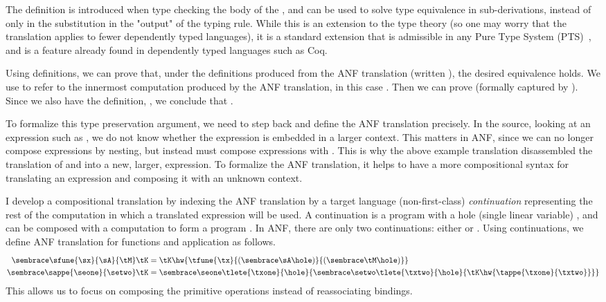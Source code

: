 The definition \im{\tx = \te} is introduced when type checking the body of the
, and can be used to solve type equivalence in sub-derivations,
instead of only in the substitution \im{\subst{\tApr}{\te}{\tx}} in the "output"
of the typing rule.
While this is an extension to the type theory (so one may worry that the
 translation applies to fewer dependently typed languages), it is a
standard extension that is admissible in any Pure Type System
(PTS)~\cite{severi1994:dpts}, and is a feature already found in dependently
typed languages such as Coq.

Using definitions, we can prove that, under the definitions  produced from the ANF translation
\im{\sembrace{\setwo}} (written \im{\edefs{\setwo}}), the desired equivalence
\im{\txtwo \equiv \sembrace{\setwo}} holds.
We use \im{\ehole{\setwo}} to refer to the innermost computation produced by
the ANF translation, in this case \im{\ehole{\setwo} = \tNtwo}.
Then we can prove \im{\edefs{\setwo} \vdash \ehole{\setwo} \equiv \anfh{\setwo}}
(formally captured by ).
Since we also have the definition, \im{\txtwo = \tNtwo}, we conclude that
\im{\edefs{\setwo} \vdash \txtwo \equiv \anfh{\setwo}}.

To formalize this type preservation argument, we need to step back and define
the ANF translation precisely.
In the source, looking at an expression such as \im{\sappe{\seone}{\setwo}}, we
do not know whether the expression is embedded in a larger context.
This matters in ANF, since we can no longer compose expressions by nesting, but
instead must compose expressions with .
This is why the above example translation disassembled the translation of
\im{\seone} and \im{\setwo} into a new, larger,  expression.
To formalize the ANF translation, it helps to have a more compositional syntax
for translating an expression and composing it with an unknown context.

I develop a compositional translation by indexing the ANF translation by a target language
(non-first-class) \emph{continuation} \im{\tK} representing the rest of the computation in which a translated expression will be used.
A continuation \im{\tK} is a program with a hole (single linear variable)
\im{\hole}, and can be composed with a computation \im{\tK\hw{\tN}} to form a
program \im{\tM}.
In ANF, there are only two continuations: either \im{\hole} or
\im{\tlete{\tx}{\hole}{\tM}}.
Using continuations, we define ANF translation for functions and application as
follows.
\begin{displaymath}
  \begin{aligned}[t]
    \anf{\sfune{\sx}{\sA}{\se}}{\tK} &= \tK\hw{\tfune{\tx}{(\anf{\sA}{\hole})}{(\anf{\se}{\hole})}} \\
    \anf{\sappe{\seone}{\setwo}}{\tK} &= \anf{\seone}{\tlete{\txone}{\hole}{\anf{\setwo}{\tlete{\txtwo}{\hole}{\tK\hw{\tappe{\txone}{\txtwo}}}}}}
  \end{aligned}
\end{displaymath}
This allows us to focus on composing the primitive operations instead of
reassociating  bindings.

